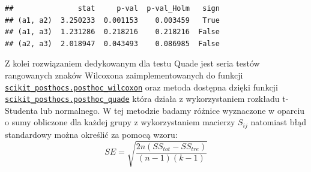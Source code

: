 \documentclass[polish,]{book}
\begin{document}
\begin{verbatim}
##               stat     p-val  p-val_Holm   sign
## (a1, a2)  3.250233  0.001153    0.003459   True
## (a1, a3)  1.231286  0.218216    0.218216  False
## (a2, a3)  2.018947  0.043493    0.086985  False
\end{verbatim}

Z kolei rozwiązaniem dedykowanym dla testu Quade jest seria testów rangowanych znaków Wilcoxona zaimplementowanych do funkcji \href{https://scikit-posthocs.readthedocs.io/en/latest/generated/scikit_posthocs.posthoc_wilcoxon/}{\texttt{scikit\_posthocs.posthoc\_wilcoxon}} oraz metoda dostępna dzięki funkcji
\href{https://scikit-posthocs.readthedocs.io/en/latest/generated/scikit_posthocs.posthoc_quade/}{\texttt{scikit\_posthocs.posthoc\_quade}} która działa z wykorzystaniem rozkładu t-Studenta lub normalnego. W tej metodzie badamy różnice wyznaczone w oparciu o sumy obliczone dla każdej grupy z wykorzystaniem macierzy \(S_{ij}\) natomiast błąd standardowy można określić za pomocą wzoru:
\begin{equation}
SE=\sqrt{\frac{2n(SS_{tot}-SS_{tre})}{(n-1)(k-1)}}
\label{eq:dep010}
\end{equation}
\end{document}
